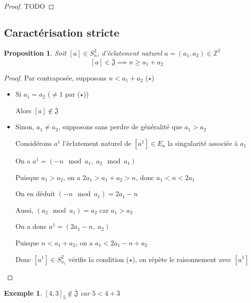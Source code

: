 \documentclass{article}
\newtheorem{proposition}{Proposition}
\newtheorem{example}{Exemple}
\begin{document}
\begin{proof}
    TODO
\end{proof}

\newpage

\subsection{Caractérisation stricte}

\begin{proposition}
    Soit $[a] \in S_n^2$, d'éclatement naturel $a = (a_1, a_2) \in \mathbb{Z}^2$
    \[ [a] \in \overline{\mathfrak{J}} \implies n \geq a_1 + a_2 \]
\end{proposition} 

\begin{proof}
    Par contraposée, supposons $n < a_1 + a_2$ ($\star$)

    \begin{itemize}
        \item Si $a_1 = a_2$ ($\neq 1$ par ($\star$))

            Alors $[a] \not \in \overline{\mathfrak{J}}$
        \item Sinon, $a_1 \neq a_2$, supposons sans perdre de généralité que $a_1 > a_2$

            Considérons $a^1$ l'éclatement naturel de $[a^1] \in E_a$ la singularité associée à $a_1$

            On a $a^1 = (-n \mod a_1,\; a_2 \mod a_1)$

            Puisque $a_1 > a_2$, on a $2a_1 > a_1 + a_2 > n$, donc $a_1 < n < 2a_1$

            On en déduit $(-n \mod a_1) = 2a_1 - n$

            Aussi, $(a_2 \mod a_1) = a_2$ car $a_1 > a_2$

            On a donc $a^1 = (2a_1-n,\; a_2)$

            Puisque $n < a_1 + a_2$, on a $a_1 < 2a_1 - n + a_2$

            Donc $[a^1] \in S_{a_1}^2$ vérifie la condition ($\star$), on répète le raisonnement avec $[a^1]$
    \end{itemize}
\end{proof}

\begin{example}
    ${[4, 3]}_5 \not \in \overline{\mathfrak{J}}$ car $5 < 4 + 3$
\end{example}
\end{document}
